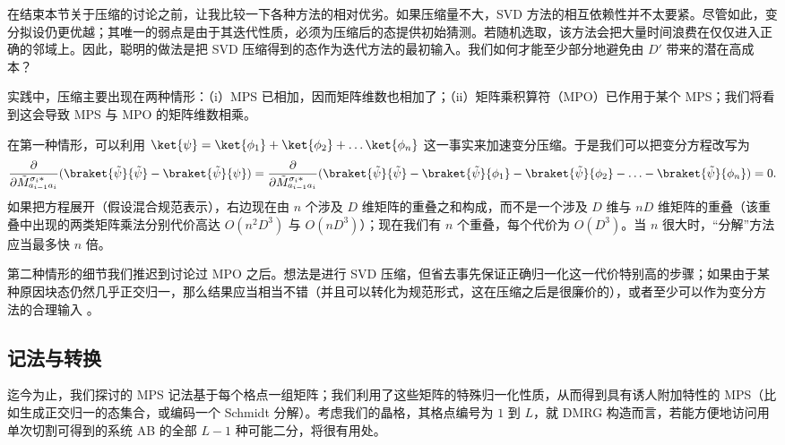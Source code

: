 在结束本节关于压缩的讨论之前，让我比较一下各种方法的相对优劣。如果压缩量不大，SVD 方法的相互依赖性并不太要紧。尽管如此，变分拟设仍更优越；其唯一的弱点是由于其迭代性质，必须为压缩后的态提供初始猜测。若随机选取，该方法会把大量时间浪费在仅仅进入正确的邻域上。因此，聪明的做法是把 SVD 压缩得到的态作为迭代方法的最初输入。我们如何才能至少部分地避免由 $D'$ 带来的潜在高成本？

实践中，压缩主要出现在两种情形：（i）MPS 已相加，因而矩阵维数也相加了；（ii）矩阵乘积算符（MPO）已作用于某个 MPS；我们将看到这会导致 MPS 与 MPO 的矩阵维数相乘。

在第一种情形，可以利用 $\ket{\psi} = \ket{\phi_1} + \ket{\phi_2} + \ldots \ket{\phi_n}$ 这一事实来加速变分压缩。于是我们可以把变分方程改写为
\begin{equation}
 \frac{\partial}{\partial \tilde{M}^{\sigma_i*}_{a_{i-1}a_i}} ( \braket{\tilde{\psi}}{\tilde{\psi}}
- \braket{\tilde{\psi}}{\psi} ) =  \frac{\partial}{\partial \tilde{M}^{\sigma_i*}_{a_{i-1}a_i}} ( \braket{\tilde{\psi}}{\tilde{\psi}} - \braket{\tilde{\psi}}{\phi_1}
- \braket{\tilde{\psi}}{\phi_2} - \ldots - \braket{\tilde{\psi}}{\phi_n}) = 0 .
\end{equation}
如果把方程展开（假设混合规范表示），右边现在由 $n$ 个涉及 $D$ 维矩阵的重叠之和构成，而不是一个涉及 $D$ 维与 $nD$ 维矩阵的重叠（该重叠中出现的两类矩阵乘法分别代价高达 $O(n^2D^3)$ 与 $O(nD^3)$）；现在我们有 $n$ 个重叠，每个代价为 $O(D^3)$。当 $n$ 很大时，``分解''方法应当最多快 $n$ 倍。

第二种情形的细节我们推迟到讨论过 MPO 之后。想法是进行 SVD 压缩，但省去事先保证正确归一化这一代价特别高的步骤；如果由于某种原因块态仍然几乎正交归一，那么结果应当相当不错（并且可以转化为规范形式，这在压缩之后是很廉价的），或者至少可以作为变分方法的合理输入 \cite{Stoudenmire10}。

\subsection{记法与转换}
迄今为止，我们探讨的 MPS 记法基于每个格点一组矩阵；我们利用了这些矩阵的特殊归一化性质，从而得到具有诱人附加特性的 MPS（比如生成正交归一的态集合，或编码一个 Schmidt 分解）。考虑我们的晶格，其格点编号为 $1$ 到 $L$，就 DMRG 构造而言，若能方便地访问用单次切割可得到的系统 AB 的全部 $L-1$ 种可能二分，将很有用处。

